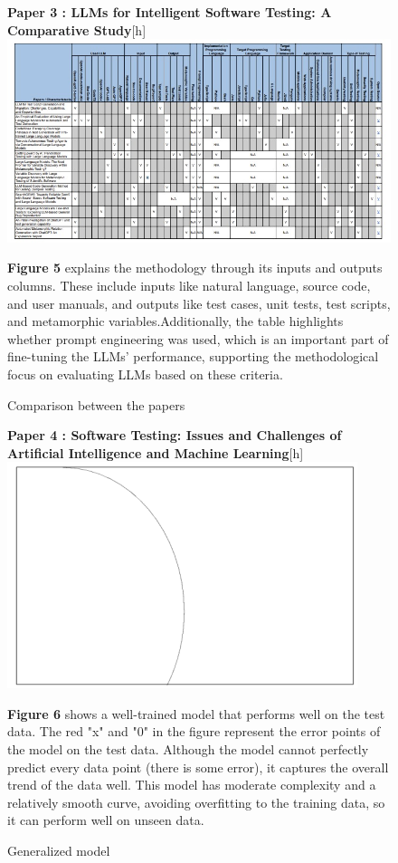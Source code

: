 \documentclass[12pt,a4paper]{article}
\begin{document}
\newpage
\begin{figure}[h]
    \textbf{Paper 3 : LLMs for Intelligent Software Testing: A Comparative Study}[h]
    \centering
    \includegraphics[width=0.8\linewidth]{pic1.jpg}
    \caption{ Comparison between the papers}
    \label{fig:enter-label}
    \vspace{0.8em}
    \textbf{Figure 5} explains the methodology through its inputs and outputs columns. These include inputs like natural language, source code, and user manuals, and outputs like test cases, unit tests, test scripts, and metamorphic variables.Additionally, the table highlights whether prompt engineering was used, which is an important part of fine-tuning the LLMs' performance, supporting the methodological focus on evaluating LLMs based on these criteria.
\end{figure}



\newpage
\begin{figure}[h]
    \textbf{Paper 4 : Software Testing: Issues and Challenges of Artificial Intelligence and Machine Learning}[h]
    \centering
    \includegraphics[width=0.8\linewidth]{Generalized model.png}
    \caption{ Generalized model}
    \label{fig:enter-label}
    \vspace{0.8em}
    \textbf{Figure 6} shows a well-trained model that performs well on the test data. The red "x" and "0" in the figure represent the error points of the model on the test data. Although the model cannot perfectly predict every data point (there is some error), it captures the overall trend of the data well. This model has moderate complexity and a relatively smooth curve, avoiding overfitting to the training data, so it can perform well on unseen data.
\end{figure}
\end{document}
